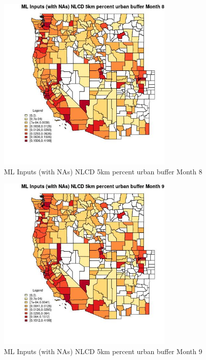 \begin{figure} 
\centering  
\includegraphics[width=0.77\textwidth]{Code_Outputs/Report_ML_input_PM25_Step4_part_f_de_duplicated_aveswNAs_CountyNLCD_5km_percent_urban_buffermedianMonth8.jpg} 
\caption{\label{fig:Report_ML_input_PM25_Step4_part_f_de_duplicated_aveswNAsCountyNLCD_5km_percent_urban_buffermedianMonth8}ML Inputs (with NAs) NLCD 5km percent urban buffer Month 8} 
\end{figure} 
 

\clearpage 

\begin{figure} 
\centering  
\includegraphics[width=0.77\textwidth]{Code_Outputs/Report_ML_input_PM25_Step4_part_f_de_duplicated_aveswNAs_CountyNLCD_5km_percent_urban_buffermedianMonth9.jpg} 
\caption{\label{fig:Report_ML_input_PM25_Step4_part_f_de_duplicated_aveswNAsCountyNLCD_5km_percent_urban_buffermedianMonth9}ML Inputs (with NAs) NLCD 5km percent urban buffer Month 9} 
\end{figure} 
 

